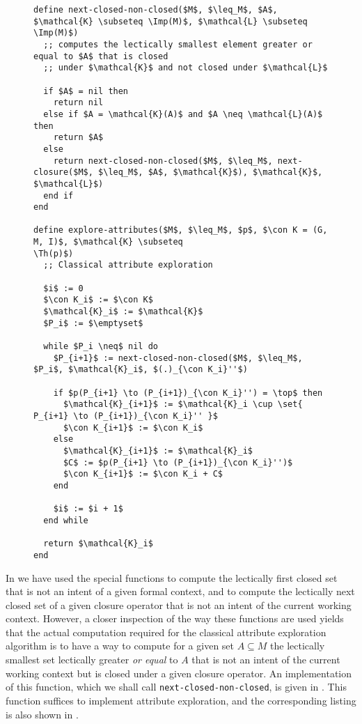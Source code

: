 
\begin{figure}[tp]
  \begin{Algorithm}
  \label{alg:explore-attributes-with-next-closed-none-closed}
  \hspace*{0cm}
\begin{lstlisting}
define next-closed-non-closed($M$, $\leq_M$, $A$, $\mathcal{K} \subseteq \Imp(M)$, $\mathcal{L} \subseteq \Imp(M)$)
  ;; computes the lectically smallest element greater or equal to $A$ that is closed
  ;; under $\mathcal{K}$ and not closed under $\mathcal{L}$

  if $A$ = nil then
    return nil
  else if $A = \mathcal{K}(A)$ and $A \neq \mathcal{L}(A)$ then
    return $A$
  else
    return next-closed-non-closed($M$, $\leq_M$, next-closure($M$, $\leq_M$, $A$, $\mathcal{K}$), $\mathcal{K}$, $\mathcal{L}$)
  end if
end

define explore-attributes($M$, $\leq_M$, $p$, $\con K = (G, M, I)$, $\mathcal{K} \subseteq
\Th(p)$)
  ;; Classical attribute exploration

  $i$ := 0
  $\con K_i$ := $\con K$
  $\mathcal{K}_i$ := $\mathcal{K}$
  $P_i$ := $\emptyset$

  while $P_i \neq$ nil do
    $P_{i+1}$ := next-closed-non-closed($M$, $\leq_M$, $P_i$, $\mathcal{K}_i$, $(.)_{\con K_i}''$)

    if $p(P_{i+1} \to (P_{i+1})_{\con K_i}'') = \top$ then
      $\mathcal{K}_{i+1}$ := $\mathcal{K}_i \cup \set{ P_{i+1} \to (P_{i+1})_{\con K_i}'' }$
      $\con K_{i+1}$ := $\con K_i$
    else
      $\mathcal{K}_{i+1}$ := $\mathcal{K}_i$
      $C$ := $p(P_{i+1} \to (P_{i+1})_{\con K_i}'')$
      $\con K_{i+1}$ := $\con K_i + C$
    end

    $i$ := $i + 1$
  end while

  return $\mathcal{K}_i$  
end
\end{lstlisting}
  \end{Algorithm}
\end{figure}

In  we have used the special functions to compute the
lectically first closed set that is not an intent of a given formal context, and to
compute the lectically next closed set of a given closure operator that is not an intent
of the current working context.  However, a closer inspection of the way these functions
are used yields that the actual computation required for the classical attribute
exploration algorithm is to have a way to compute for a given set $A \subseteq M$ the
lectically smallest set lectically greater \emph{or equal} to $A$ that is not an intent of
the current working context but is closed under a given closure operator.  An
implementation of this function, which we shall call \lstinline{next-closed-non-closed},
is given in .  This function
suffices to implement attribute exploration, and the corresponding listing is also shown
in .

